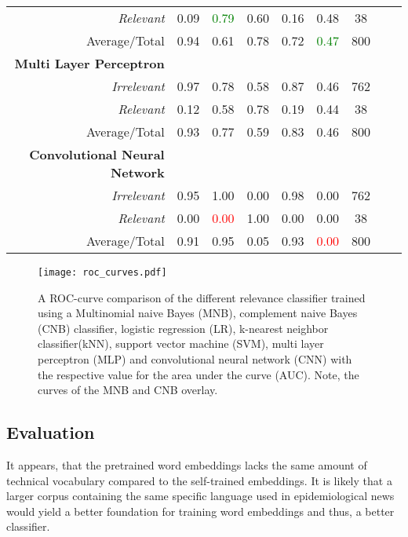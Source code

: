 \begin{table}
\begin{tabular}{@{}rcccccccc@{}}
      \emph{Relevant}& 0.09& \textcolor{green}{0.79}&  0.60& 0.16& 0.48& 38 \\
      Average/Total& 0.94& 0.61& 0.78& 0.72& \textcolor{green}{0.47}& 800 \vspace{2mm}\\
      \textbf{Multi Layer Perceptron}\\
      \emph{Irrelevant}& 0.97& 0.78&  0.58& 0.87& 0.46& 762 \\
      \emph{Relevant}& 0.12& 0.58&  0.78& 0.19& 0.44& 38 \\
      Average/Total& 0.93& 0.77& 0.59& 0.83& 0.46& 800 \\
      \textbf{Convolutional Neural Network}\\
      \emph{Irrelevant}& 0.95& 1.00&  0.00& 0.98& 0.00& 762 \\
      \emph{Relevant}& 0.00& \textcolor{red}{0.00}&  1.00& 0.00& 0.00& 38 \\
      Average/Total& 0.91& 0.95& 0.05& 0.93& \textcolor{red}{0.00}& 800 \\
      \bottomrule
    \end{tabular}
  \label{table:recommender_performance}
  \end{table}

  \begin{figure}
    \centering
    \texttt{[image: roc\_curves.pdf]}
    \caption{A ROC-curve comparison of the different relevance classifier trained using a Multinomial naive Bayes (MNB), complement naive Bayes (CNB) classifier, logistic regression (LR), k-nearest neighbor classifier(kNN), support vector machine (SVM), multi layer perceptron (MLP) and convolutional neural network (CNN) with the respective value for the area under the curve (AUC). Note, the curves of the MNB and CNB overlay.}
  \label{fig:roc_key}
  \end{figure}

\subsection{Evaluation}
  It appears, that the pretrained word embeddings lacks the same amount of technical vocabulary compared to the self-trained embeddings.
  It is likely that a larger corpus containing the same specific language used in epidemiological news would yield a better foundation for training word embeddings and thus, a better classifier.

